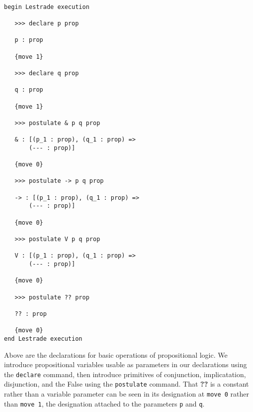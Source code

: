 \documentclass[12pt]{article}
\begin{document}
\begin{verbatim}

begin Lestrade execution

   >>> declare p prop

   p : prop

   {move 1}

   >>> declare q prop

   q : prop

   {move 1}

   >>> postulate & p q prop

   & : [(p_1 : prop), (q_1 : prop) => 
       (--- : prop)]

   {move 0}

   >>> postulate -> p q prop

   -> : [(p_1 : prop), (q_1 : prop) => 
       (--- : prop)]

   {move 0}

   >>> postulate V p q prop

   V : [(p_1 : prop), (q_1 : prop) => 
       (--- : prop)]

   {move 0}

   >>> postulate ?? prop

   ?? : prop

   {move 0}
end Lestrade execution
\end{verbatim}

Above are the declarations for basic operations of propositional logic.  We introduce propositional variables usable as parameters in our declarations using the {\tt declare\/} command, then
introduce primitives of conjunction, implicatation, disjunction, and the False using the {\tt postulate\/} command.  That {\bf ??} is a constant rather than a variable parameter
can be seen in its designation at {\tt move 0\/} rather than {\tt move 1\/}, the designation attached to the parameters {\tt p} and {\tt q\/}.
\end{document}
